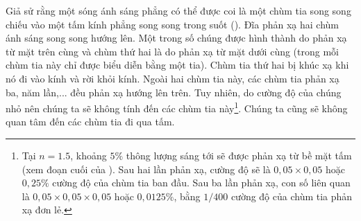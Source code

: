 Giả sử rằng một sóng ánh sáng phẳng có thể được coi là một chùm tia song song chiếu vào một tấm kính phẳng song song trong suốt ().
Đĩa phản xạ hai chùm ánh sáng song song hướng lên.
Một trong số chúng được hình thành do phản xạ từ mặt trên cùng và chùm thứ hai là do phản xạ từ mặt dưới cùng (trong  mỗi chùm tia này chỉ được biểu diễn bằng một tia).
Chùm tia thứ hai bị khúc xạ khi nó đi vào kính và rời khỏi kính.
Ngoài hai chùm tia này, các chùm tia phản xạ ba, năm lần,... đều phản xạ hướng lên trên.
Tuy nhiên, do cường độ của chúng nhỏ nên chúng ta sẽ không tính đến các chùm tia này\footnote{Tại $n=1.5$, khoảng $5\%$ thông lượng sáng tới sẽ được phản xạ từ bề mặt tấm (xem đoạn cuối của ). Sau hai lần phản xạ, cường độ sẽ là $0,05\times 0,05$ hoặc $0,25\%$ cường độ của chùm tia ban đầu. Sau ba lần phản xạ, con số liên quan là $0,05\times 0,05\times 0,05$ hoặc $0,0125\%$, bằng $1/400$ cường độ của chùm tia phản xạ đơn lẻ.}.
Chúng ta cũng sẽ không quan tâm đến các chùm tia đi qua tấm.

